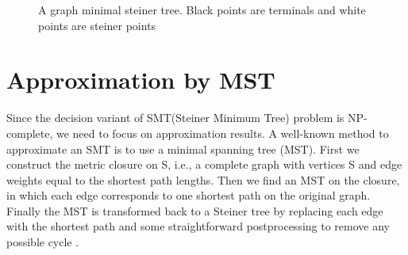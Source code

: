 \documentclass[a4paper]{article}
\begin{document}
\begin{figure}
\caption{A graph minimal steiner tree. Black points are terminals and white points are steiner points}
\label{graph1}
\end{figure}

\section{Approximation by MST}
Since the decision variant of SMT(Steiner Minimum Tree) problem is NP-complete, we need to focus on approximation results. A well-known method to approximate an SMT is to use a minimal spanning tree (MST). First we construct the metric closure on S, i.e., a complete graph with vertices S and edge weights equal to the shortest path lengths. Then we find an MST on the closure, in which each edge corresponds to one shortest path on the original graph. Finally the MST is transformed back to a Steiner tree by replacing each edge with the shortest path and some straightforward postprocessing to remove any possible cycle \cite{MST}.
\end{document}
